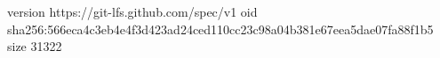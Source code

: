 version https://git-lfs.github.com/spec/v1
oid sha256:566eca4c3eb4e4f3d423ad24ced110cc23c98a04b381e67eea5dae07fa88f1b5
size 31322
